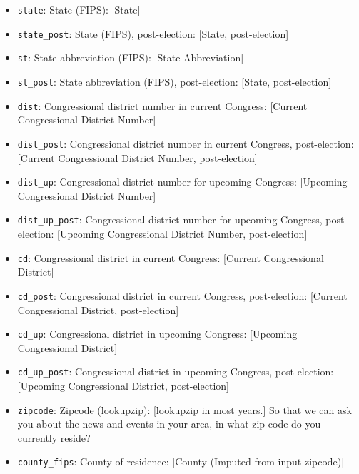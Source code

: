 \documentclass[10pt,article,oneside]{memoir}
\theoremstyle{definition}
\begin{document}
\begin{itemize}
\tightlist
\item
  \texttt{state}: State (FIPS): {[}State{]}
\item
  \texttt{state\_post}: State (FIPS), post-election: {[}State,
  post-election{]}
\item
  \texttt{st}: State abbreviation (FIPS): {[}State Abbreviation{]}
\item
  \texttt{st\_post}: State abbreviation (FIPS), post-election: {[}State,
  post-election{]}
\item
  \texttt{dist}: Congressional district number in current Congress:
  {[}Current Congressional District Number{]}
\item
  \texttt{dist\_post}: Congressional district number in current
  Congress, post-election: {[}Current Congressional District Number,
  post-election{]}
\item
  \texttt{dist\_up}: Congressional district number for upcoming
  Congress: {[}Upcoming Congressional District Number{]}
\item
  \texttt{dist\_up\_post}: Congressional district number for upcoming
  Congress, post-election: {[}Upcoming Congressional District Number,
  post-election{]}
\item
  \texttt{cd}: Congressional district in current Congress: {[}Current
  Congressional District{]}
\item
  \texttt{cd\_post}: Congressional district in current Congress,
  post-election: {[}Current Congressional District, post-election{]}
\item
  \texttt{cd\_up}: Congressional district in upcoming Congress:
  {[}Upcoming Congressional District{]}
\item
  \texttt{cd\_up\_post}: Congressional district in upcoming Congress,
  post-election: {[}Upcoming Congressional District, post-election{]}
\item
  \texttt{zipcode}: Zipcode (lookupzip): {[}lookupzip in most years.{]}
  So that we can ask you about the news and events in your area, in what
  zip code do you currently reside?
\item
  \texttt{county\_fips}: County of residence: {[}County (Imputed from
  input zipcode){]}
\end{itemize}
\end{document}
